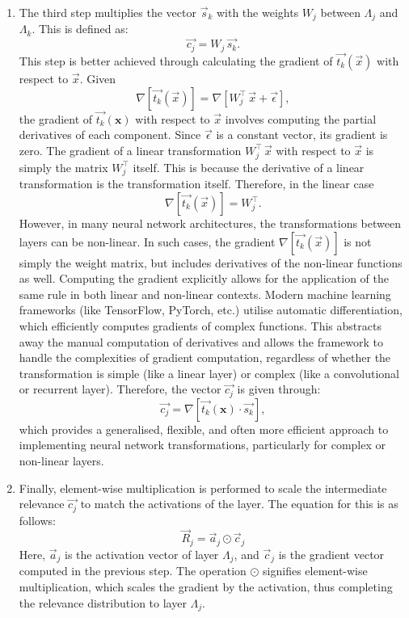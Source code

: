 \begin{enumerate}
   \item The third step multiplies the vector $\vec{s}_k$ with the weights $W_j$ between $\Lambda_j$ and $\Lambda_k$. This is defined as: 
\begin{equation*}
   \vec{c_{j}} =  W_j\, \vec{s_{k}}.
\end{equation*} 
This step is better achieved through calculating the gradient of \(\vec{t_{k}}(\vec{x})\) with respect to \(\vec{x}\). Given 
\begin{equation*}
    \nabla\left [\vec{t_{k}}(\vec{x}) \right] = \nabla\left [W_j^\intercal\, \vec{x} + \vec{\epsilon} \right],
\end{equation*} 
the gradient of \(\vec{t_{k}}(\boldsymbol{x})\) with respect to \(\vec{x}\) involves computing the partial derivatives of each component. Since \(\vec{\epsilon}\) is a constant vector, its gradient is zero. The gradient of a linear transformation \(W_j^\intercal\, \vec{x}\) with respect to \(\vec{x}\) is simply the matrix \(W_j^\intercal\) itself. This is because the derivative of a linear transformation is the transformation itself. Therefore, in the linear case
\begin{equation*}
    \nabla\left [\vec{t_{k}}(\vec{x}) \right] = W_j^\intercal.
\end{equation*}
However, in many neural network architectures, the transformations between layers can be non-linear. In such cases, the gradient \(\nabla\left [\vec{t_{k}}(\vec{x}) \right]\) is not simply the weight matrix, but includes derivatives of the non-linear functions as well. Computing the gradient explicitly allows for the application of the same rule in both linear and non-linear contexts. Modern machine learning frameworks (like TensorFlow, PyTorch, etc.) utilise automatic differentiation, which efficiently computes gradients of complex functions. This abstracts away the manual computation of derivatives and allows the framework to handle the complexities of gradient computation, regardless of whether the transformation is simple (like a linear layer) or complex (like a convolutional or recurrent layer). Therefore, the vector $\vec{c_{j}}$ is given through:
 \begin{equation*}
    \vec{c_{j}} = \nabla\left [\vec{t_{k}}(\boldsymbol{x}) \cdot \vec{s_{k}}\right],
\end{equation*}
which provides a generalised, flexible, and often more efficient approach to implementing neural network transformations, particularly for complex or non-linear layers.
   \item Finally, element-wise multiplication is performed to scale the intermediate relevance $\vec{c_{j}}$ to match the activations of the layer. The equation for this is as follows:
   \[
   \vec{R}_{j} = \vec{a}_{j} \odot \vec{c}_{j}
   \]
   Here, $\vec{a}_{j}$ is the activation vector of layer $\Lambda_j$, and $\vec{c}_{j}$ is the gradient vector computed in the previous step. The operation $\odot$ signifies element-wise multiplication, which scales the gradient by the activation, thus completing the relevance distribution to layer $\Lambda_j$.
\end{enumerate}

